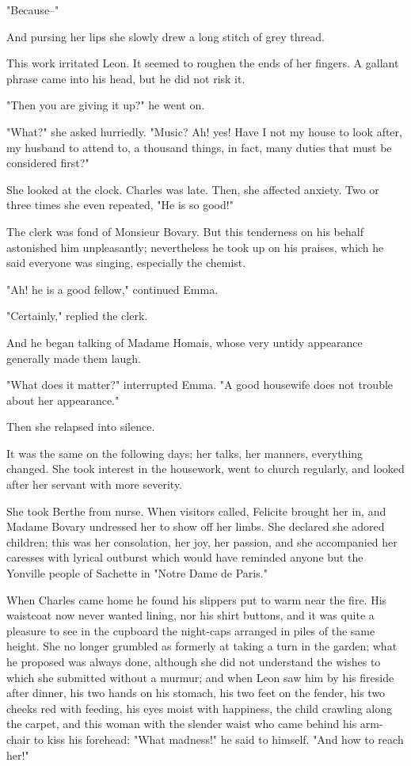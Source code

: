 \documentclass[11pt,twocolumn]{ltugboat}
\begin{document}
"Because--"

And pursing her lips she slowly drew a long stitch of grey thread.

This work irritated Leon. It seemed to roughen the ends of her fingers.
A gallant phrase came into his head, but he did not risk it.

"Then you are giving it up?" he went on.

"What?" she asked hurriedly. "Music? Ah! yes! Have I not my house to
look after, my husband to attend to, a thousand things, in fact, many
duties that must be considered first?"

She looked at the clock. Charles was late. Then, she affected anxiety.
Two or three times she even repeated, "He is so good!"

The clerk was fond of Monsieur Bovary. But this tenderness on his behalf
astonished him unpleasantly; nevertheless he took up on his praises,
which he said everyone was singing, especially the chemist.

"Ah! he is a good fellow," continued Emma.

"Certainly," replied the clerk.

And he began talking of Madame Homais, whose very untidy appearance
generally made them laugh.

"What does it matter?" interrupted Emma. "A good housewife does not
trouble about her appearance."

Then she relapsed into silence.

It was the same on the following days; her talks, her manners,
everything changed. She took interest in the housework, went to church
regularly, and looked after her servant with more severity.

She took Berthe from nurse. When visitors called, Felicite brought her
in, and Madame Bovary undressed her to show off her limbs. She declared
she adored children; this was her consolation, her joy, her passion,
and she accompanied her caresses with lyrical outburst which would have
reminded anyone but the Yonville people of Sachette in "Notre Dame de
Paris."

When Charles came home he found his slippers put to warm near the fire.
His waistcoat now never wanted lining, nor his shirt buttons, and it was
quite a pleasure to see in the cupboard the night-caps arranged in piles
of the same height. She no longer grumbled as formerly at taking a turn
in the garden; what he proposed was always done, although she did not
understand the wishes to which she submitted without a murmur; and when
Leon saw him by his fireside after dinner, his two hands on his stomach,
his two feet on the fender, his two cheeks red with feeding, his eyes
moist with happiness, the child crawling along the carpet, and this
woman with the slender waist who came behind his arm-chair to kiss his
forehead: "What madness!" he said to himself. "And how to reach her!"
\end{document}
